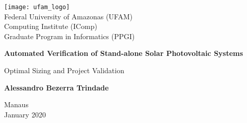 \begin{titlepage}
    \begin{center}
      \texttt{[image: ufam\_logo]} \\
        \Large
        Federal University of Amazonas (UFAM)\\
        Computing Institute (IComp)\\
        Graduate Program in Informatics (PPGI)\\

        \vspace*{3cm}
        
        \Huge
        \textbf{Automated Verification of Stand-alone Solar Photovoltaic Systems}
        
        \vspace{0.5cm}
        \LARGE
        Optimal Sizing and Project Validation

        \vspace{3.0cm}
        
        \textbf{Alessandro Bezerra Trindade}
        
%        
%        
        \vspace{3cm}
%        
        
        \Large
		Manaus \\

        January 2020 \\


    \end{center}
\end{titlepage}